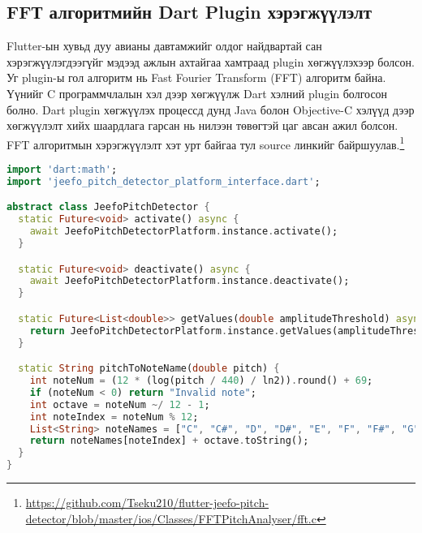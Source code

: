 
\subsection{FFТ алгоритмийн Dart Plugin хэрэгжүүлэлт}

Flutter-ын хувьд дуу авианы давтамжийг олдог найдвартай сан хэрэгжүүлэгдээгүйг мэдээд ажлын ахтайгаа хамтраад plugin хөгжүүлэхээр болсон. Уг plugin-ы гол алгоритм нь Fast Fourier Transform (FFT) алгоритм байна. Үүнийг C программчлалын хэл дээр хөгжүүлж Dart хэлний plugin болгосон болно. Dart plugin хөгжүүлэх процессд дунд Java болон Objective-C хэлүүд дээр хөгжүүлэлт хийх шаардлага гарсан нь нилээн төвөгтэй цаг авсан ажил болсон. FFT алгоритмын хэрэгжүүлэлт хэт урт байгаа тул source линкийг байршуулав.\footnote{\url{https://github.com/Tseku210/flutter-jeefo-pitch-detector/blob/master/ios/Classes/FFTPitchAnalyser/fft.c}}

\begin{lstlisting}[language=Dart, caption=Давтамж тодорхойлох абстракт класс, frame=single]
import 'dart:math';
import 'jeefo_pitch_detector_platform_interface.dart';

abstract class JeefoPitchDetector {
  static Future<void> activate() async {
    await JeefoPitchDetectorPlatform.instance.activate();
  }

  static Future<void> deactivate() async {
    await JeefoPitchDetectorPlatform.instance.deactivate();
  }

  static Future<List<double>> getValues(double amplitudeThreshold) async {
    return JeefoPitchDetectorPlatform.instance.getValues(amplitudeThreshold);
  }

  static String pitchToNoteName(double pitch) {
    int noteNum = (12 * (log(pitch / 440) / ln2)).round() + 69;
    if (noteNum < 0) return "Invalid note";
    int octave = noteNum ~/ 12 - 1;
    int noteIndex = noteNum % 12;
    List<String> noteNames = ["C", "C#", "D", "D#", "E", "F", "F#", "G", "G#", "A", "A#", "B"];
    return noteNames[noteIndex] + octave.toString();
  }
}

\end{lstlisting}


